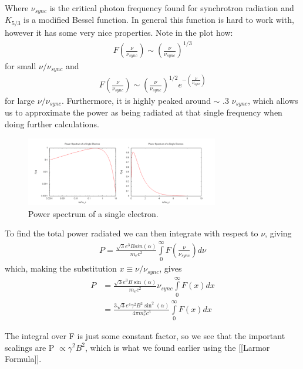 \documentclass{article}
\begin{document}
Where $\nu_{sync}$ is the critical photon frequency found for synchrotron radiation and $K_{5/3}$ is a modified Bessel function.  In general this function is hard to work with, however it has some very nice properties.  Note in the plot how:
$$\begin{aligned}F\left(\frac{\nu}{\nu_{sync}}\right) \sim \left(\frac{\nu}{\nu_{sync}}\right)^{1/3} 
\end{aligned}$$
for small $\nu/\nu_{sync}$
and 
 $$\begin{aligned} F\left(\frac{\nu}{\nu_{sync}}\right) \sim \left(\frac{\nu}{\nu_{sync}}\right)^{1/2}e^{- \left(\frac{\nu}{\nu_{sync}}\right)}
\end{aligned}$$
for large $\nu/\nu_{sync}$.
Furthermore, it is highly peaked around $\sim$ .3 $\nu_{sync}$, which allows us to approximate
the power as being radiated at that single frequency when doing further calculations.

\begin{figure}
    \centering
    \includegraphics[width=0.75\textwidth]{Screen Shot 2020-11-08 at 8.06.18 PM.png}
    \caption{Power spectrum of a single electron.}
    \label{fig:power_spec}
\end{figure}

To find the total power radiated we can then integrate with respect to $\nu$, giving
 $$\begin{aligned}P = \frac{\sqrt{3}e^3 B sin(\alpha)}{m_e c^2} \int \limits ^{\infty}_{0} F\left(\frac{\nu}{\nu_{sync}}\right) d\nu
\end{aligned}$$
which, making the substitution $x \equiv \nu/\nu_{sync}$, gives
 $$\begin{aligned}P &= \frac{\sqrt{3}e^3 B \sin(\alpha)}{m_e c^2} \nu_{sync} \int \limits ^{\infty}_{0} F\left(x\right) dx \\
 & = \frac{3\sqrt{3}e^4 \gamma^2 B^2 \sin^2(\alpha)}{4 \pi m_e^2 c^3} \int \limits ^{\infty}_{0} F\left(x\right) dx
\end{aligned}$$

The integral over F is just some constant factor, so we see that the important scalings are P $\propto \gamma^2 B^2$, which is what we found earlier using the [[Larmor Formula]].
\end{document}
